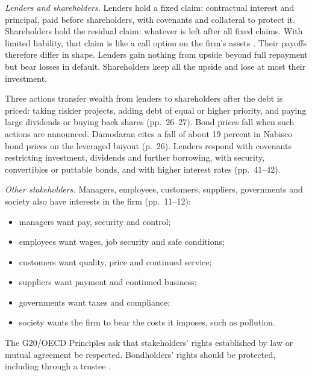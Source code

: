 \begin{qfdefinition}\label{def:stakeholder-claims}
 \emph{Lenders and shareholders.} Lenders hold a fixed claim: contractual interest and principal, paid before shareholders, with covenants and collateral to protect it. Shareholders hold the residual claim: whatever is left after all fixed claims. With limited liability, that claim is like a call option on the firm's assets \citep[pp.~1--2, 26--27]{applied-corporate-finance-2014}. Their payoffs therefore differ in shape. Lenders gain nothing from upside beyond full repayment but bear losses in default. Shareholders keep all the upside and lose at most their investment.

Three actions transfer wealth from lenders to shareholders after the debt is priced: taking riskier projects, adding debt of equal or higher priority, and paying large dividends or buying back shares (pp.~26--27). Bond prices fall when such actions are announced. Damodaran cites a fall of about 19 percent in Nabisco bond prices on the leveraged buyout (p.~26). Lenders respond with covenants restricting investment, dividends and further borrowing, with security, convertibles or puttable bonds, and with higher interest rates (pp.~41--42).

\emph{Other stakeholders.} Managers, employees, customers, suppliers, governments and society also have interests in the firm (pp.~11--12):
\begin{itemize}
\item managers want pay, security and control;
\item employees want wages, job security and safe conditions;
\item customers want quality, price and continued service;
\item suppliers want payment and continued business;
\item governments want taxes and compliance;
\item society wants the firm to bear the costs it imposes, such as pollution.
\end{itemize}
The G20/OECD Principles ask that stakeholders' rights established by law or mutual agreement be respected. Bondholders' rights should be protected, including through a trustee \citep[principles~VI.D and~VI.D.6, pp.~48--49]{oecd-g20-principles-2023}.


\end{qfdefinition}
